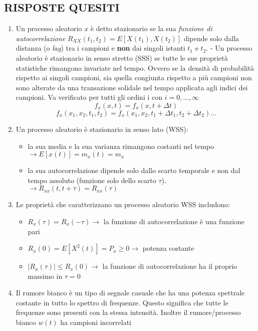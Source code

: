 \documentclass[
]{article}
\providecommand{\tightlist}{%
  \setlength{\itemsep}{0pt}\setlength{\parskip}{0pt}}
\begin{document}
\newpage

\subsection{RISPOSTE QUESITI}\label{risposte-quesiti}

\begin{enumerate}
\def\labelenumi{\arabic{enumi}.}
\item
  Un processo aleatorio \(x\) è detto stazionario se la sua
  \emph{funzione di autocorrelazione}
  \(R_{XX}(t_1, t_2) = E[X(t_1), X(t_2)]\) dipende solo dalla distanza
  (o \emph{lag}) tra i campioni e \textbf{non} dai singoli istanti
  \(t_1\) e \(t_2\). - Un processo aleatorio è stazionario in senso
  stretto (SSS) se tutte le sue proprietà statistiche rimangono
  invariate nel tempo. Ovvero se la densità di probabilità rispetto ai
  singoli campioni, sia quella congiunta rispetto a più campioni non
  sono alterate da una transazione solidale nel tempo applicata agli
  indici dei campioni. Va verificato per tutti gli ordini i con
  \(i= 0, \dots, \infty\) \[
  f_x (x, t) = f_x(x, t+ \Delta t)\] \[
  f_x(x_1, x_2, t_1, t_2) = f_x(x_1, x_2, t_1 + \Delta t_1, t_2 + \Delta t_2)...
  \]
\item
  Un processo aleatorio è stazionario in senso lato (WSS):

  \begin{itemize}
  \tightlist
  \item
    la sua media e la sua varianza rimangono costanti nel tempo
    \(\to E[x(t)] = m_x(t) = m_x\)\\
  \item
    la sua autocorrelazione dipende solo dallo scarto temporale e non
    dal tempo assoluto (funzione solo dello scarto \(\tau\)).
    \(\to R_{xx}(t, t+\tau) = R_{xx}(\tau)\)
  \end{itemize}
\item
  Le proprietà che caratterizzano un processo aleatorio WSS includono:

  \begin{itemize}
  \item
    \(R_x(\tau) = R_x(-\tau) \to\) la funzione di autocorrelazione è una
    funzione pari
  \item
    \(R_x(0)= E[X^2(t)] = P_x \geq 0 \to\) potenza costante
  \item
    \(|R_x(\tau)| \leq R_x(0) \to\) la funzione di autocorrelazione ha
    il proprio massimo in \(\tau = 0\)
  \end{itemize}
\item
  Il rumore bianco è un tipo di segnale casuale che ha una potenza
  spettrale costante in tutto lo spettro di frequenze. Questo significa
  che tutte le frequenze sono presenti con la stessa intensità. Inoltre
  il rumore/processo bianco \(w(t)\) ha campioni incorrelati


\end{enumerate}
\end{document}
